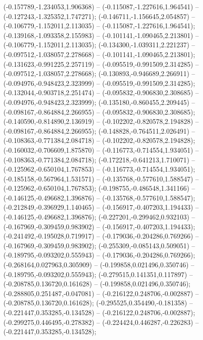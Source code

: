  (-0.157789,-1.234053,1.906368) -- (-0.115087,-1.227616,1.964541) -- (-0.127243,-1.325352,1.747271);
 (-0.146711,-1.156645,2.054857) -- (-0.106779,-1.152011,2.113035) -- (-0.115087,-1.227616,1.964541);
 (-0.139168,-1.093358,2.155983) -- (-0.101141,-1.090465,2.213801) -- (-0.106779,-1.152011,2.113035);
 (-0.134300,-1.039311,2.221237) -- (-0.097512,-1.038057,2.278668) -- (-0.101141,-1.090465,2.213801);
 (-0.131623,-0.991225,2.257119) -- (-0.095519,-0.991509,2.314285) -- (-0.097512,-1.038057,2.278668);
 (-0.130893,-0.946689,2.266911) -- (-0.094976,-0.948423,2.323999) -- (-0.095519,-0.991509,2.314285);
 (-0.132044,-0.903718,2.251474) -- (-0.095832,-0.906830,2.308685) -- (-0.094976,-0.948423,2.323999);
 (-0.135180,-0.860455,2.209445) -- (-0.098167,-0.864884,2.266955) -- (-0.095832,-0.906830,2.308685);
 (-0.140590,-0.814890,2.136919) -- (-0.102202,-0.820578,2.194828) -- (-0.098167,-0.864884,2.266955);
 (-0.148828,-0.764511,2.026491) -- (-0.108363,-0.771384,2.084718) -- (-0.102202,-0.820578,2.194828);
 (-0.160032,-0.706609,1.875870) -- (-0.116773,-0.714554,1.934051) -- (-0.108363,-0.771384,2.084718);
 (-0.172218,-0.641213,1.710071) -- (-0.125962,-0.650104,1.767853) -- (-0.116773,-0.714554,1.934051);
 (-0.185158,-0.567964,1.531571) -- (-0.135768,-0.577610,1.588547) -- (-0.125962,-0.650104,1.767853);
 (-0.198755,-0.486548,1.341166) -- (-0.146125,-0.496682,1.396876) -- (-0.135768,-0.577610,1.588547);
 (-0.212849,-0.396929,1.140465) -- (-0.156917,-0.407203,1.194433) -- (-0.146125,-0.496682,1.396876);
 (-0.227201,-0.299462,0.932103) -- (-0.167969,-0.309459,0.983902) -- (-0.156917,-0.407203,1.194433);
 (-0.241492,-0.195028,0.719917) -- (-0.179036,-0.204286,0.769266) -- (-0.167969,-0.309459,0.983902);
 (-0.255309,-0.085143,0.509051) -- (-0.189795,-0.093202,0.555943) -- (-0.179036,-0.204286,0.769266);
 (-0.268164,0.027963,0.305909) -- (-0.199858,0.021496,0.350746) -- (-0.189795,-0.093202,0.555943);
 (-0.279515,0.141351,0.117897) -- (-0.208785,0.136720,0.161628) -- (-0.199858,0.021496,0.350746);
 (-0.288805,0.251487,-0.047081) -- (-0.216122,0.248706,-0.002887) -- (-0.208785,0.136720,0.161628);
 (-0.295525,0.354490,-0.181358) -- (-0.221447,0.353285,-0.134528) -- (-0.216122,0.248706,-0.002887);
 (-0.299275,0.446495,-0.278382) -- (-0.224424,0.446287,-0.226283) -- (-0.221447,0.353285,-0.134528);
